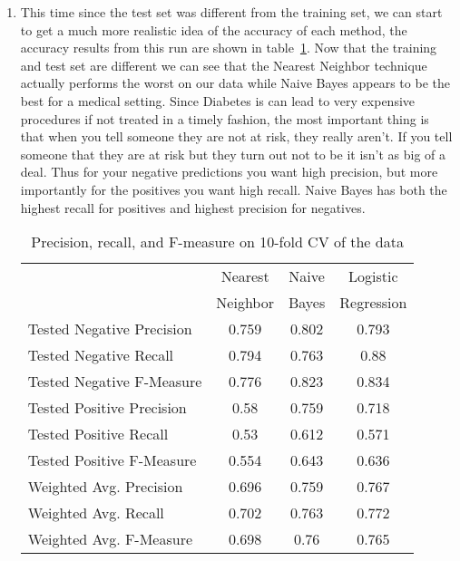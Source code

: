 \documentclass[12pt]{article}
\begin{document}
\begin{enumerate}
\begin{enumerate}
\item %
This time since the test set was different from the training set, we can start to get a much more realistic idea of the accuracy of each method, the accuracy results from this run are shown in table~\ref{tab:partc}. Now that the training and test set are different we can see that the Nearest Neighbor technique actually performs the worst on our data while Naive Bayes appears to be the best for a medical setting. Since Diabetes is can lead to very expensive procedures if not treated in a timely fashion, the most important thing is that when you tell someone they are not at risk, they really aren't. If you tell someone that they are at risk but they turn out not to be it isn't as big of a deal. Thus for your negative predictions you want high precision, but more importantly for the positives you want high recall. Naive Bayes has both the highest recall for positives and highest precision for negatives.

\begin{table}[htdp]
\caption{Precision, recall, and F-measure on 10-fold CV of the data}
\begin{center}
\begin{tabular}{l||c|c|c|}
               & Nearest & Naive & Logistic  \\
               & Neighbor &  Bayes & Regression  \\
               \hline
Tested Negative Precision & 0.759 & 0.802 & 0.793 \\
Tested Negative Recall & 0.794  & 0.763 & 0.88 \\
Tested Negative F-Measure & 0.776 & 0.823 & 0.834 \\
Tested Positive Precision & 0.58 & 0.759  & 0.718 \\
Tested Positive Recall & 0.53 & 0.612 & 0.571 \\
Tested Positive F-Measure &  0.554 & 0.643 & 0.636  \\
Weighted Avg. Precision & 0.696 & 0.759 & 0.767\\
Weighted Avg. Recall & 0.702  & 0.763 & 0.772 \\
Weighted Avg. F-Measure & 0.698   & 0.76  & 0.765  \\
\end{tabular}
\end{center}
\label{tab:partc}
\end{table}%


\end{enumerate}
\end{enumerate}
\end{document}
